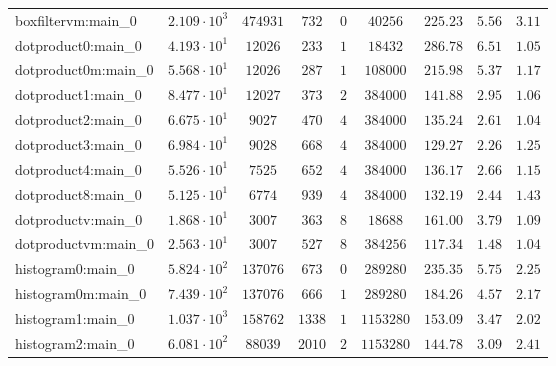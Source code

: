 \begin{tabular}{|l|c|c|c|c|c|c|c|c|}
boxfiltervm:main\_0            & $ 2.109 \cdot 10^{3} $ & $ 474931   $ & $ 732    $ & $ 0    $ & $ 40256    $ & $ 225.23      $ & $ 5.56    $ & $ 3.11    $ \\
dotproduct0:main\_0            & $ 4.193 \cdot 10^{1} $ & $ 12026    $ & $ 233    $ & $ 1    $ & $ 18432    $ & $ 286.78      $ & $ 6.51    $ & $ 1.05    $ \\
dotproduct0m:main\_0           & $ 5.568 \cdot 10^{1} $ & $ 12026    $ & $ 287    $ & $ 1    $ & $ 108000   $ & $ 215.98      $ & $ 5.37    $ & $ 1.17    $ \\
dotproduct1:main\_0            & $ 8.477 \cdot 10^{1} $ & $ 12027    $ & $ 373    $ & $ 2    $ & $ 384000   $ & $ 141.88      $ & $ 2.95    $ & $ 1.06    $ \\
dotproduct2:main\_0            & $ 6.675 \cdot 10^{1} $ & $ 9027     $ & $ 470    $ & $ 4    $ & $ 384000   $ & $ 135.24      $ & $ 2.61    $ & $ 1.04    $ \\
dotproduct3:main\_0            & $ 6.984 \cdot 10^{1} $ & $ 9028     $ & $ 668    $ & $ 4    $ & $ 384000   $ & $ 129.27      $ & $ 2.26    $ & $ 1.25    $ \\
dotproduct4:main\_0            & $ 5.526 \cdot 10^{1} $ & $ 7525     $ & $ 652    $ & $ 4    $ & $ 384000   $ & $ 136.17      $ & $ 2.66    $ & $ 1.15    $ \\
dotproduct8:main\_0            & $ 5.125 \cdot 10^{1} $ & $ 6774     $ & $ 939    $ & $ 4    $ & $ 384000   $ & $ 132.19      $ & $ 2.44    $ & $ 1.43    $ \\
dotproductv:main\_0            & $ 1.868 \cdot 10^{1} $ & $ 3007     $ & $ 363    $ & $ 8    $ & $ 18688    $ & $ 161.00      $ & $ 3.79    $ & $ 1.09    $ \\
dotproductvm:main\_0           & $ 2.563 \cdot 10^{1} $ & $ 3007     $ & $ 527    $ & $ 8    $ & $ 384256   $ & $ 117.34      $ & $ 1.48    $ & $ 1.04    $ \\
histogram0:main\_0             & $ 5.824 \cdot 10^{2} $ & $ 137076   $ & $ 673    $ & $ 0    $ & $ 289280   $ & $ 235.35      $ & $ 5.75    $ & $ 2.25    $ \\
histogram0m:main\_0            & $ 7.439 \cdot 10^{2} $ & $ 137076   $ & $ 666    $ & $ 1    $ & $ 289280   $ & $ 184.26      $ & $ 4.57    $ & $ 2.17    $ \\
histogram1:main\_0             & $ 1.037 \cdot 10^{3} $ & $ 158762   $ & $ 1338   $ & $ 1    $ & $ 1153280  $ & $ 153.09      $ & $ 3.47    $ & $ 2.02    $ \\
histogram2:main\_0             & $ 6.081 \cdot 10^{2} $ & $ 88039    $ & $ 2010   $ & $ 2    $ & $ 1153280  $ & $ 144.78      $ & $ 3.09    $ & $ 2.41    $ \\

\end{tabular}

